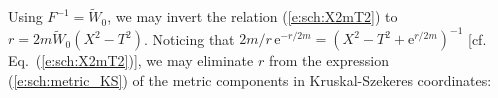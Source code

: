 Using $F^{-1} = \tilde{W}_0$, we may invert the relation (\ref{e:sch:X2mT2})
to $r = 2m \tilde{W}_0(X^2-T^2)$. Noticing that
$2m/r \, \mathrm{e}^{-r/2m} = (X^2-T^2 + \mathrm{e}^{r/2m})^{-1}$
[cf. Eq.~(\ref{e:sch:X2mT2})], we may eliminate $r$ from the expression
(\ref{e:sch:metric_KS})
of the metric components in Kruskal-Szekeres coordinates:
\be \label{e:sch:metric_KS_TX_partial}
\ee


